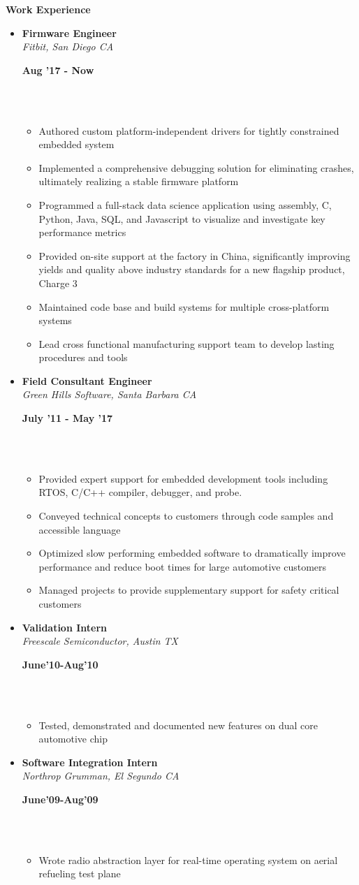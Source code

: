 \documentclass[a4paper,11pt]{article}
\newcommand{\isep}{0 pt}
\newcommand{\resheading}[1]{{\small \colorbox{mygrey}{\begin{minipage}{0.975\textwidth}{\textbf{#1 \vphantom{p\^{E}}}}\end{minipage}}}}
\newcommand{\workexp}[4]{
\begin{minipage}[t]{7cm}
\begin{flushleft}
\textbf{#1} \\
\indent \emph{#2}\\
\end{flushleft}
\end{minipage}
\hfill
\begin{minipage}[t]{7cm}
\begin{flushright}
\textbf{#3} \\
\indent #4 \\
\end{flushright}
\end{minipage}
\\[-0.10in]
}
\begin{document}
\resheading{\textbf{Work Experience}}
\begin{itemize}
\item
\workexp{Firmware Engineer}{Fitbit, San Diego CA}{Aug '17 - Now}{}
	\begin{itemize}\itemsep \isep
	    \item Authored custom platform-independent drivers for tightly constrained embedded system
	    \item Implemented a comprehensive debugging solution for eliminating crashes, ultimately realizing a stable firmware platform
	    \item Programmed a full-stack data science application using assembly, C, Python, Java, SQL, and Javascript to visualize and investigate key performance metrics
	    \item Provided on-site support at the factory in China, significantly improving yields and quality above industry standards for a new flagship product, Charge 3
	    \item Maintained code base and build systems for multiple cross-platform systems
	    \item Lead cross functional manufacturing support team to develop lasting procedures and tools
    \end{itemize}

\item
\workexp{Field Consultant Engineer}{Green Hills Software, Santa Barbara CA}{July '11 - May '17}{}
	\begin{itemize}\itemsep \isep
		\item Provided expert support for embedded development tools including RTOS, C/C++ compiler, debugger, and probe.
		\item Conveyed technical concepts to customers through code samples and accessible language
		\item Optimized slow performing embedded software to dramatically improve performance and reduce boot times for large automotive customers
		\item Managed projects to provide supplementary support for safety critical customers
	\end{itemize}

\item
\workexp{Validation Intern}{Freescale Semiconductor, Austin TX}{June'10-Aug'10}{}
	\begin{itemize}\itemsep \isep
		\item Tested, demonstrated and documented new features on dual core automotive chip
	\end{itemize}
\item
\workexp{Software Integration Intern}{Northrop Grumman, El Segundo CA}{June'09-Aug'09}{}
	\begin{itemize}\itemsep \isep
		\item Wrote radio abstraction layer for real-time operating system on aerial refueling test plane
	\end{itemize}
\end{itemize}
\end{document}
